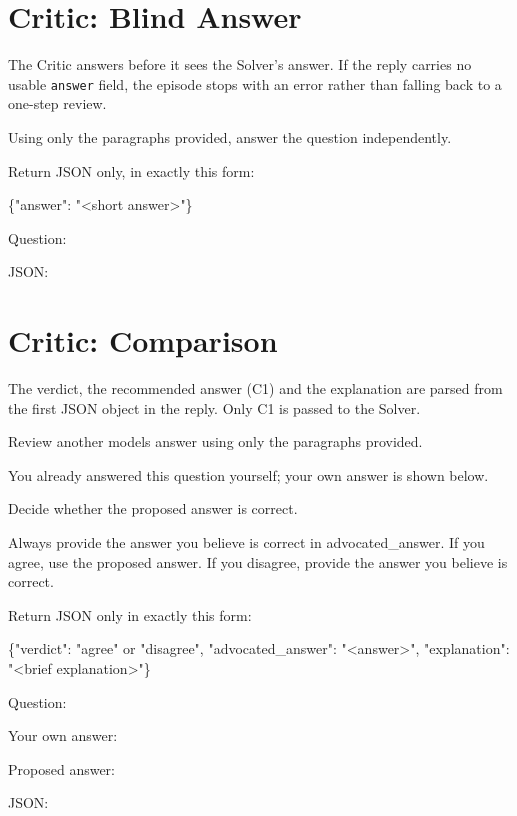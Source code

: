 \section{Critic: Blind Answer}

The Critic answers before it sees the Solver's answer. If the reply carries no
usable \texttt{answer} field, the episode stops with an error rather than
falling back to a one-step review.

\begin{promptbox}
Using only the paragraphs provided, answer the question independently.\par
Return JSON only, in exactly this form:\par
\{"answer": "\textless{}short answer\textgreater{}"\}\par
\promptblank
{}\par
\promptblank
Question: \par
JSON:\par
\end{promptbox}

\section{Critic: Comparison}

The verdict, the recommended answer (C1) and the explanation are parsed from
the first JSON object in the reply. Only C1 is passed to the Solver.

\begin{promptbox}
Review another model\textquotesingle{}s answer using only the paragraphs provided.\par
You already answered this question yourself; your own answer is shown below.\par
Decide whether the proposed answer is correct.\par
Always provide the answer you believe is correct in advocated\_answer. If you agree, use the proposed answer. If you disagree, provide the answer you believe is correct.\par
Return JSON only in exactly this form:\par
\{"verdict": "agree" or "disagree", "advocated\_answer": "\textless{}answer\textgreater{}", "explanation": "\textless{}brief explanation\textgreater{}"\}\par
\promptblank
{}\par
\promptblank
Question: \par
Your own answer: \par
Proposed answer: \par
JSON:\par
\end{promptbox}

